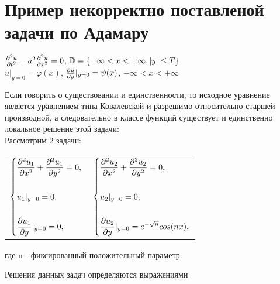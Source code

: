 \documentclass[../main.tex]{subfiles}
\begin{document}
\section{Пример некорректно поставленой задачи по Адамару}
\begin{large}
	\begin{center}
		$\frac{\partial^2 u}{\partial t^2}-a^2\frac{\partial^2 u}{\partial x^2}=0$, $\mathbb{D}=\{ -\infty<x<+\infty, |y|\leq T\rbrace$\\
		$ $\\
		$ u|_{y=0} = \varphi(x)$, $\frac{\partial u}{\partial y}|_{y=0} = \psi(x)$, $ -\infty<x<+\infty$\\
		$ $\\
	\end{center}
\end{large}

Если говорить о существовании и единственности, то исходное уравнение является уравнением типа Ковалевской и разрешимо относительно старшей производной, а следовательно в классе функций существует и единственно локальное решение этой задачи:\\

Рассмотрим 2 задачи:\\

\begin{center}

	\begin{tabular}{c c}

		$
			\begin{dcases}
				\frac{\partial^2 u_1}{\partial x^2}+\frac{\partial^2 u_1}{\partial y^2}=0, \\\\
				u_1|_{y=0}=0,                        \\\\
				\frac{\partial u_1}{\partial y}|_{y=0}=0,
			\end{dcases} $
		 &
		$\begin{dcases}
				 \frac{\partial^2 u_2}{\partial x^2}+\frac{\partial^2 u_2}{\partial y^2}=0, \\\\
				 u_2|_{y=0}=0,                        \\\\
				 \frac{\partial u_2}{\partial y}|_{y=0}=e^{-\sqrt{n}}cos(nx),
			 \end{dcases} $
	\end{tabular}

\end{center}
где n - фиксированный положительный параметр.

Решения данных задач определяются выражениями
\end{document}

